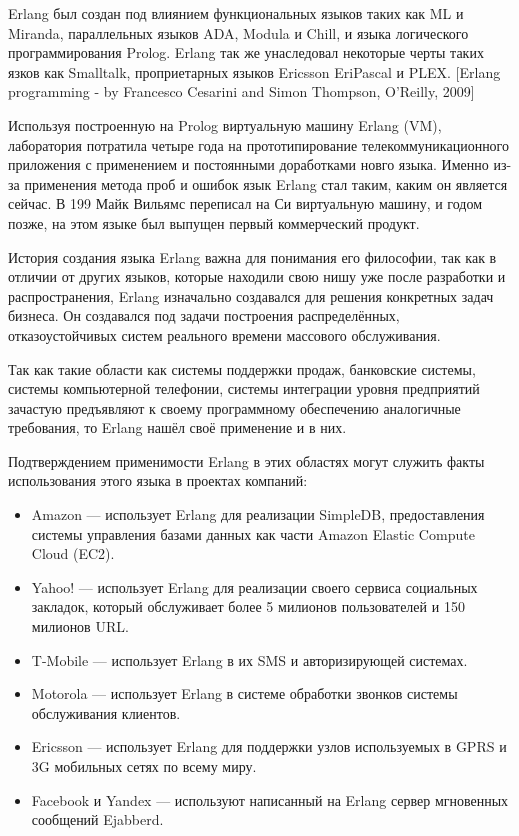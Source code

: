 \begin{par}
Erlang был создан под влиянием  функциональных языков таких как  ML и Miranda, параллельных языков ADA, Modula и Chill, и языка логического программирования Prolog. Erlang так же унаследовал некоторые черты таких язков как Smalltalk, проприетарных языков Ericsson EriPascal и PLEX.
[Erlang programming - by Francesco Cesarini and Simon Thompson, O'Reilly, 2009]
\end{par}

\begin{par}
Используя построенную на Prolog виртуальную машину Erlang (VM), лаборатория потратила  четыре года на прототипирование телекоммуникационного приложения с применением и постоянными доработками новго языка. Именно из-за применения метода проб и ошибок язык Erlang стал таким, каким он является сейчас. В 199 Майк Вильямс переписал на Си виртуальную машину, и годом позже, на этом языке был выпущен первый коммерческий продукт. 
\end{par}

\begin{par}
История создания языка Erlang важна для понимания его философии, так как в отличии от других языков, которые находили свою нишу уже после разработки и распространения, Erlang изначально создавался для решения конкретных задач бизнеса. Он создавался под задачи построения распределённых, отказоустойчивых систем реального времени массового обслуживания.
\end{par}

\begin{par}
Так как такие области как системы поддержки продаж, банковские системы, системы компьютерной телефонии, системы интеграции уровня предприятий зачастую предъявляют к своему программному обеспечению аналогичные требования, то Erlang нашёл своё применение и в них.
\end{par}

Подтверждением применимости Erlang в этих областях могут служить факты использования этого языка в проектах компаний:
\begin{itemize}
	\item{} Amazon --- использует Erlang для реализации SimpleDB, предоставления системы управления базами данных как части Amazon Elastic Compute Cloud (EC2).
	\item{} Yahoo! --- использует Erlang для реализации своего сервиса социальных закладок, который обслуживает более 5 милионов пользователей и 150 милионов URL.
	\item{} T-Mobile --- использует Erlang в их SMS и авторизирующей системах.
	\item{} Motorola --- использует Erlang в системе обработки звонков системы обслуживания клиентов.
	\item{} Ericsson --- использует Erlang для поддержки узлов используемых в GPRS и 3G мобильных сетях по всему миру.
	\item{} Facebook и Yandex --- используют написанный на Erlang сервер мгновенных сообщений Ejabberd.
\end{itemize}
